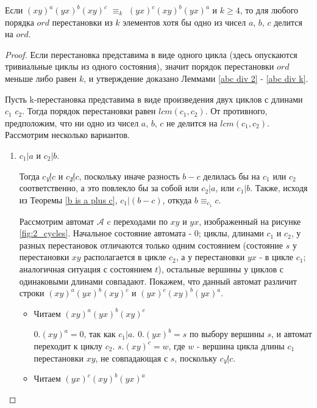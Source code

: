 	\begin{theorem}
		Если $(xy)^a(yx)^b(xy)^c$ $\equiv_k$ $(yx)^c(xy)^b(yx)^a$ и $k \ge 4$, то для любого порядка $ord$ перестановки из $k$ элементов хотя бы одно из чисел $a$, $b$, $c$ делится на $ord$.
	\end{theorem}
	\begin{proof}
		Если перестановка представима в виде одного цикла (здесь опускаются тривиальные циклы из одного состояния), значит порядок перестановки $ord$ меньше либо равен $k$, и утверждение доказано Леммами \ref{abc div 2} - \ref{abc div k}.
		
		Пусть k-перестановка представима в виде произведения двух циклов с длинами $c_1$ $c_2$. Тогда порядок перестановки равен $lcm(c_1, c_2)$. От противного, предположим, что ни одно из чисел $a$, $b$, $c$ не делится на $lcm(c_1, c_2)$. Рассмотрим несколько вариантов.
		
		\begin{enumerate}
			\item $c_1 | a$ и $c_2 | b$.
			
			Тогда $c_1 \not | c$ и $c_2 \not | c$, поскольку иначе разность $b-c$ делилась бы на $c_1$ или $c_2$ соответственно, а это повлекло бы за собой или $c_2 | a$, или $c_1 | b$. Также, исходя из Теоремы \ref{b is a plus c}, $c_1 | (b-c)$, откуда $b \equiv_{c_1} c$.
			
			Рассмотрим автомат $\mathscr{A}$ c переходами по $xy$ и $yx$, изображенный на рисунке \ref{fig:2_cycles}. Начальное состояние автомата - $0$; циклы, длинами $c_1$ и $c_2$, у разных перестановок отличаются только одним состоянием (состояние $s$ у перестановки $xy$ располагается в цикле $c_2$, а у перестановки $yx$ - в цикле $c_1$; аналогичная ситуация с состоянием $t$), остальные вершины у циклов с одинаковыми длинами совпадают. Покажем, что данный автомат различит строки $(xy)^a(yx)^b(xy)^c$ и $(yx)^c(xy)^b(yx)^a$.
			
			\begin{itemize}
				\item Читаем $(xy)^a(yx)^b(xy)^c$
				
				$0.(xy)^a = 0$, так как $c_1 | a$. $0.(yx)^b = s$ по выбору вершины $s$, и автомат переходит к циклу $c_2$. $s.(xy)^c = w$, где $w$ - вершина цикла длины $c_1$ перестановки $xy$, не совпадающая с $s$, поскольку $c_1 \not | c$. 
				
				\item Читаем $(yx)^c(xy)^b(yx)^a$
				

\end{itemize}
\end{enumerate}
\end{proof}
